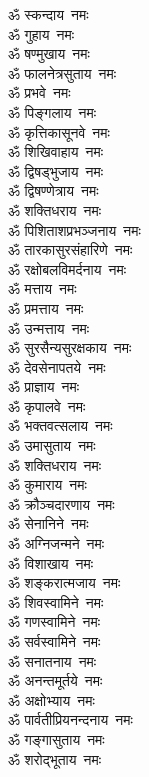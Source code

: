 
\begin{multicols}{2}
\begin{flushleft}
ॐ स्कन्दाय~नमः\\
ॐ गुहाय~नमः\\
ॐ षण्मुखाय~नमः\\
ॐ फालनेत्रसुताय~नमः\\
ॐ प्रभवे~नमः\\
ॐ पिङ्गलाय~नमः\\
ॐ कृत्तिकासूनवे~नमः\\
ॐ शिखिवाहाय~नमः\\
ॐ द्विषड्भुजाय~नमः\\
ॐ द्विषण्णेत्राय~नमः\hfill{}\\
ॐ शक्तिधराय~नमः\\
ॐ पिशिताशप्रभञ्जनाय~नमः\\
ॐ तारकासुरसंहारिणे~नमः\\
ॐ रक्षोबलविमर्दनाय~नमः\\
ॐ मत्ताय~नमः\\
ॐ प्रमत्ताय~नमः\\
ॐ उन्मत्ताय~नमः\\
ॐ सुरसैन्यसुरक्षकाय~नमः\\
ॐ देवसेनापतये~नमः\\
ॐ प्राज्ञाय~नमः\hfill{}\\
ॐ कृपालवे~नमः\\
ॐ भक्तवत्सलाय~नमः\\
ॐ उमासुताय~नमः\\
ॐ शक्तिधराय~नमः\\
ॐ कुमाराय~नमः\\
ॐ क्रौञ्चदारणाय~नमः\\
ॐ सेनानिने~नमः\\
ॐ अग्निजन्मने~नमः\\
ॐ विशाखाय~नमः\\
ॐ शङ्करात्मजाय~नमः\hfill{}\\
ॐ शिवस्वामिने~नमः\\
ॐ गणस्वामिने~नमः\\
ॐ सर्वस्वामिने~नमः\\
ॐ सनातनाय~नमः\\
ॐ अनन्तमूर्तये~नमः\\
ॐ अक्षोभ्याय~नमः\\
ॐ पार्वतीप्रियनन्दनाय~नमः\\
ॐ गङ्गासुताय~नमः\\
ॐ शरोद्भूताय~नमः\\

\end{flushleft}
\end{multicols}
